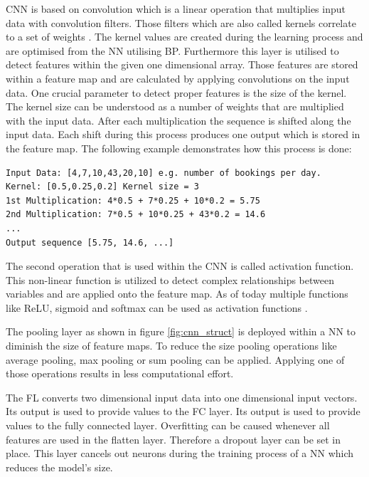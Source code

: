 CNN is based on convolution which is a linear operation that multiplies input data with convolution filters. Those filters which are also called kernels correlate to a set of weights \cite{cnn_vechicle}. The kernel values are created during the learning process and are optimised from the NN utilising BP. Furthermore this layer is utilised to detect features within the given one dimensional array. Those features are stored within a feature map and are calculated by applying convolutions on the input data. One crucial parameter to detect proper features is the size of the kernel. The kernel size can be understood as a number of weights that are multiplied with the input data. After each multiplication the sequence is shifted along the input data. Each shift during this process produces one output which is stored in the feature map. The following example demonstrates how this process is done:\cite{1d_cnn}
\begin{lstlisting}
Input Data: [4,7,10,43,20,10] e.g. number of bookings per day. 
Kernel: [0.5,0.25,0.2] Kernel size = 3
1st Multiplication: 4*0.5 + 7*0.25 + 10*0.2 = 5.75
2nd Multiplication: 7*0.5 + 10*0.25 + 43*0.2 = 14.6
...
Output sequence [5.75, 14.6, ...]
\end{lstlisting}
The second operation that is used within the CNN is called activation function. This non-linear function is utilized to detect complex relationships between variables and are applied onto the feature map. As of today multiple functions like ReLU, sigmoid and softmax can be used as activation functions \cite{cnn_basic3}.

The pooling layer as shown in figure \ref{fig:cnn_struct} is deployed within a NN to diminish the size of feature maps. To reduce the size pooling operations like average pooling, max pooling or sum pooling can be applied. Applying one of those operations results in less computational effort.\cite{cnn_basic}


The FL converts two dimensional input data into one dimensional input vectors. Its output is used to provide values to the FC layer. Its output is used to provide values to the fully connected layer. Overfitting can be caused whenever all features are used in the flatten layer. Therefore a dropout layer can be set in place.\cite{1d_cnn} This layer cancels out neurons during the training process of a NN which reduces the model's size. 

